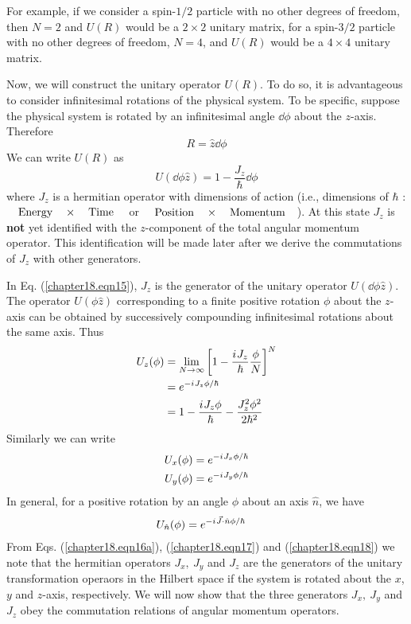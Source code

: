 For example, if we consider a spin-$1/2$ particle with no other degrees of freedom, then $N=2$ and $U(R)$ would be a $2\times 2$ unitary matrix, for a spin-$3/2$ particle with no other degrees of freedom, $N=4$, and $U(R)$ would be a $4\times 4$ unitary matrix.


Now, we will construct the unitary operator $U(R)$. To do so, it is advantageous to consider infinitesimal rotations of the physical system. To be specific, suppose the physical system is rotated by an infinitesimal angle $\dd{\phi}$ about the $z$-axis. Therefore
\begin{equation}
R = \hat{z} \dd{\phi}
\end{equation}
We can write $U(R)$ as
\begin{equation}
\label{chapter18.eqn15}
U(\dd{\phi} \hat{z}) = 1 - \frac{J_z}{\hbar} \dd{\phi}
\end{equation}
where $J_z$ is a hermitian operator with dimensions of action (i.e., dimensions of $\hbar$ : $\qq{Energy}\times \qq{Time}$ or $\qq{Position}\times \qq{Momentum}$). At this state $J_z$ is \textbf{not} yet identified with the $z$-component of the total angular momentum operator. This identification will be made later after we derive the commutations of $J_z$ with other generators.


In Eq. (\ref{chapter18.eqn15}), $J_z$ is the generator of the unitary operator $U(\dd{\phi} \hat{z})$. The operator $U(\phi \hat{z})$ corresponding to a finite positive rotation $\phi$ about the $z$-axis can be obtained by successively compounding infinitesimal rotations about the same axis. Thus
\begin{align}
U_z(\phi) 
&= \lim\limits_{N \rightarrow \infty} \qty[1 - \frac{{i\mkern1mu} J_z}{\hbar} \frac{\phi}{N}]^N \nonumber\\
\label{chapter18.eqn16a}
&= e^{-{i\mkern1mu} J_z \phi/\hbar} \\
\label{chapter18.eqn16b}
&= 1 - \frac{{i\mkern1mu} J_z \phi}{\hbar} - \frac{J_z^2 \phi^2}{2 \hbar^2}
\end{align}
Similarly we can write
\begin{align}
\label{chapter18.eqn17}
U_x(\phi) &= e^{-{i\mkern1mu} J_x \phi/\hbar} \\
\label{chapter18.eqn18}
U_y(\phi) &= e^{-{i\mkern1mu} J_y \phi/\hbar}
\end{align}
In general, for a positive rotation by an angle $\phi$ about an axis $\hat{n}$, we have
\begin{align}
\label{chapter18.eqn19}
U_{\hat{n}}(\phi) &= e^{-{i\mkern1mu} \vec{J}\cdot\hat{n} \phi/\hbar}
\end{align}
From Eqs. (\ref{chapter18.eqn16a}), (\ref{chapter18.eqn17}) and (\ref{chapter18.eqn18}) we note that the hermitian operators $J_x,\ J_y$ and $J_z$ are the generators of the unitary transformation operaors in the Hilbert space if the system is rotated about the $x$, $y$ and $z$-axis, respectively. We will now show that the three generators $J_x,\ J_y$ and $J_z$ obey the commutation relations of angular momentum operators.



